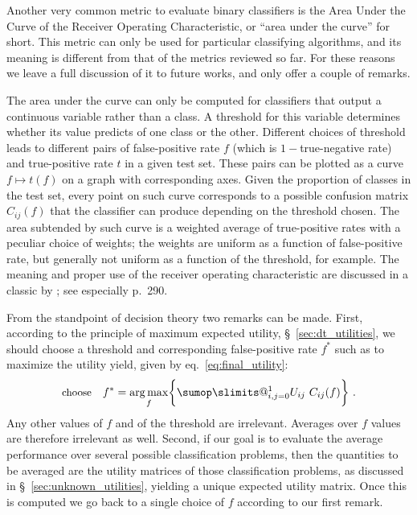 \documentclass[\ifafour a4paper,12pt,\else a5paper,10pt,\fi%
onecolumn,oneside,article,%
british%
]{memoir}
\makeatletter
\theoremstyle{remark}
\theoremstyle{innote}
\def\sum{\DOTSI\sumop\slimits@}
\DeclarePairedDelimiter\set{\{}{\}} %
\renewcommand*{\|}[1][]{\nonscript\:#1\vert\nonscript\:\mathopen{}}
\newcommand*{\sect}{\S}%
\newcommand*{\eqn}{eq.}%
\DeclareMathOperator*{\argmax}{arg\,max}
\makeatother
\begin{document}
Another very common metric to evaluate binary classifiers is the Area Under the Curve of the Receiver Operating Characteristic, or \enquote{area under the curve} for short. This metric can only be used for particular classifying algorithms, and its meaning is different from that of the metrics reviewed so far. For these reasons we leave a full discussion of it to future works, and only offer a couple of remarks.

The area under the curve can only be computed for classifiers that output a continuous variable rather than a class. A threshold for this variable determines whether its value predicts of one class or the other. Different choices of threshold leads to different pairs of false-positive rate $f$ (which is $1-{}$true-negative rate) and true-positive rate $t$ in a given test set. These pairs can be plotted as a curve $f \mapsto t(f)$ on a graph with corresponding axes. Given the proportion of classes in the test set, every point on such curve corresponds to a possible confusion matrix $C_{ij}(f)$ that the classifier can produce depending on the threshold chosen. The area subtended by such curve is a weighted average of true-positive rates with a peculiar choice of weights; the weights are uniform as a function of false-positive rate, but generally not uniform as a function of the threshold, for example. The meaning and proper use of the receiver operating characteristic are discussed in a classic by \textcites{metz1978}; see especially p.~290.


\medskip

From the standpoint of decision theory two remarks can be made\autocites[similar points are made by][]{bakeretal2001,loboetal2008}. First, according to the principle of maximum expected utility, \sect~\ref{sec:dt_utilities}, we should choose a threshold and corresponding false-positive rate $f^{*}$ such as to maximize the utility yield, given by \eqn~\eqref{eq:final_utility}:
\begin{equation}
  \label{eq:threshold_auc_maxutility}
  \text{\small choose}\quad
  f^{*} = \argmax_{f}\set[\bigg]{\sum_{i,j=0}^{1} U_{ij}\ C_{ij}(f)} \ .
\end{equation}
Any other values of $f$ and of the threshold are irrelevant. Averages over $f$ values are therefore irrelevant as well. Second, if our goal is to evaluate the average performance over several possible classification problems, then the quantities to be averaged are the utility matrices of those classification problems, as discussed in \sect~\ref{sec:unknown_utilities}, yielding a unique expected utility matrix. Once this is computed we go back to a single choice of $f$ according to our first remark.
\end{document}
